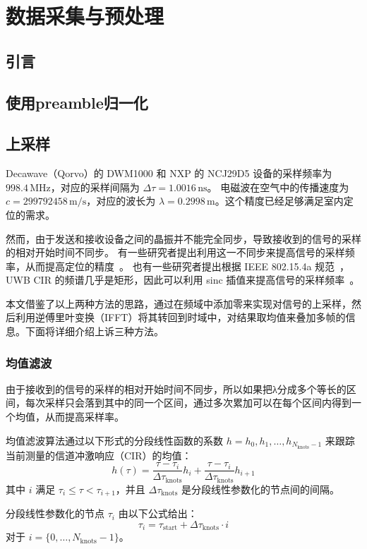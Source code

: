 \chapter{数据采集与预处理}
\section{引言}
\section{使用preamble归一化}
\section{上采样}
Decawave（Qorvo）的 DWM1000 和 NXP 的 NCJ29D5 设备的采样频率为 \(998.4 \, \text{MHz}\)，对应的采样间隔为 \( \Delta \tau = 1.0016 \, \text{ns}\)。
电磁波在空气中的传播速度为 \(c = 299792458 \, \text{m/s}\)，对应的波长为 \(\lambda = 0.2998 \, \text{m}\)。这个精度已经足够满足室内定位的需求。

然而，由于发送和接收设备之间的晶振并不能完全同步，导致接收到的信号的采样的相对开始时间不同步。
有一些研究者提出利用这一不同步来提高信号的采样频率，从而提高定位的精度~\cite{Ledergerber}。
也有一些研究者提出根据 IEEE 802.15.4a 规范~\cite{IEEE_Std_802.15.4a}， UWB CIR 的频谱几乎是矩形，因此可以利用 sinc 插值来提高信号的采样频率~\cite{MAMPI}。

本文借鉴了以上两种方法的思路，通过在频域中添加零来实现对信号的上采样，然后利用逆傅里叶变换（IFFT）将其转回到时域中，对结果取均值来叠加多帧的信息。下面将详细介绍上诉三种方法。

\subsection{均值滤波}
由于接收到的信号的采样的相对开始时间不同步，所以如果把λ分成多个等长的区间，每次采样只会落到其中的同一个区间，通过多次累加可以在每个区间内得到一个均值，从而提高采样率。

均值滤波算法通过以下形式的分段线性函数的系数 \( h = h_0 , h_1 , \ldots , h_{N_{\text{knots}} -1} \) 来跟踪当前测量的信道冲激响应（CIR）的均值：
\[ h(\tau ) = \frac{\tau  - \tau_i}{\Delta \tau_{\text{knots}}} h_i + \frac{\tau  - \tau_i}{\Delta \tau_{\text{knots}}} h_{i +1} \]
其中 \( i \) 满足 \( \tau_i \leq \tau < \tau_{i+1} \)，并且 \( \Delta \tau_{\text{knots}} \) 是分段线性参数化的节点间的间隔。

分段线性参数化的节点 \( \tau_i \) 由以下公式给出：
\[ \tau_i = \tau_{\text{start}} + \Delta \tau_{\text{knots}} \cdot i \]
对于 \( i = \{0, \ldots , N_{\text{knots}} - 1\} \)。

